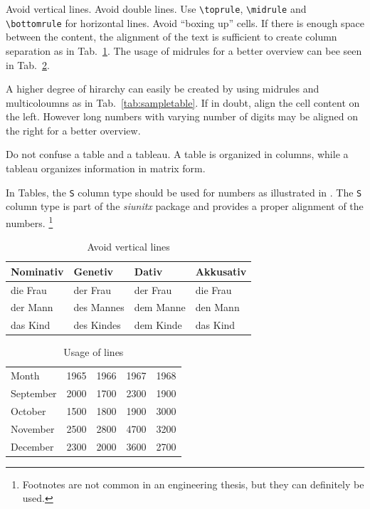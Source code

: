 Avoid vertical lines. 
Avoid double lines. Use \verb|\toprule|, \verb|\midrule| and \verb|\bottomrule| for horizontal lines.
Avoid ``boxing up'' cells. If there is enough space between the content, the alignment of the text is sufficient to create column separation as in Tab.~\ref{tab:tabellensatz}. 
The usage of midrules for a better overview can bee seen in Tab.~\ref{tab:linien}. 


A higher degree of hirarchy can easily be created by using midrules and multicoloumns as in Tab.~\ref{tab:sampletable}. 
If in doubt, align the cell content on the left. 
However long numbers with varying number of digits may be aligned on the right for a better overview.

Do not confuse a table and a tableau. 
A table is organized in columns, while a tableau organizes information in matrix form. 

In Tables, the \texttt{S} column type should be used for numbers as illustrated in . 
The \texttt{S} column type is part of the \emph{siunitx} package and provides a proper alignment of the numbers.
\footnote{Footnotes are not common in an engineering thesis, but they can definitely be used.}


\begin{table}[tp]
    \centering
    \caption{Avoid vertical lines}
    \label{tab:tabellensatz}
    \begin{tabular}{@{}*{4}{l}@{}}
        \toprule
        Nominativ & Genetiv & Dativ & Akkusativ \\
        \midrule
        die Frau & der Frau   & der Frau  & die Frau \\
        der Mann & des Mannes & dem Manne & den Mann \\
        das Kind & des Kindes & dem Kinde & das Kind \\
        \bottomrule
    \end{tabular}
\end{table}%
%
\begin{table}[tp]
    \centering
    \caption{Usage of lines}
    \label{tab:linien}
    \begin{tabular}{@{}l*{4}{c}@{}}
        \toprule
        Month & 1965 & 1966 & 1967 & 1968 \\
        \cmidrule(r){1-1}\cmidrule(lr){2-2}\cmidrule(lr){3-3}\cmidrule(lr){4-4}%
        \cmidrule(l){5-5}
        September & 2000 & 1700 & 2300 & 1900 \\
        October   & 1500 & 1800 & 1900 & 3000 \\
        November  & 2500 & 2800 & 4700 & 3200 \\
        December  & 2300 & 2000 & 3600 & 2700 \\
        \bottomrule
    \end{tabular}
\end{table}	  

